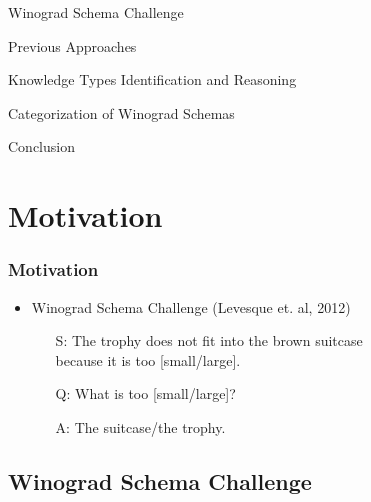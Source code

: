 \documentclass[c,8pt,xcolor...,x11names]{beamer}
\begin{document}
 
\begin{frame}
\customtitle
\begin{list2}
\item Winograd Schema Challenge
\item Previous Approaches
\item Knowledge Types Identification and Reasoning
\item Categorization of Winograd Schemas
\item Conclusion
\end{list2}
\end{frame}


\section{Motivation} 


\begin{frame}
  \frametitle{Motivation}
	\begin{itemize} 	
	\item Winograd Schema Challenge (Levesque et. al, 2012)
	\begin{itemize}
		\normalsize
		\item[S:] The trophy does not fit into the brown suitcase\\ because \alert{it} is too \alert{[small/large]}.
		\item[Q:] What is too [small/large]?
		\item[A:] The suitcase/the trophy.
	\end{itemize}	
	
\end{itemize}
		\centering

\end{frame}

\begin{comment}
	content...

\begin{frame}
\vfill
\begin{LARGE}
\hfill Structure of a {\sc Beamer} Document \hfill 
\end{LARGE}
\vfill
\end{frame}
\end{comment}

\subsection{Winograd Schema Challenge}
\end{document}
